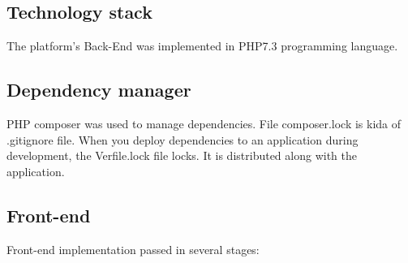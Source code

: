 \documentclass[thesis=B,english]{FITthesis}[2019/03/06]
\begin{document}
\subsection{Technology stack}
The platform's Back-End was implemented in PHP7.3 programming language.

\subsection{Dependency manager}
PHP composer was used to manage dependencies.
File composer.lock is kida of .gitignore file.
When you deploy dependencies to an application during development, the Verfile.lock file locks. It is distributed along with the application.
 
\subsection{Front-end}
Front-end implementation  passed in several stages: 
\end{document}
